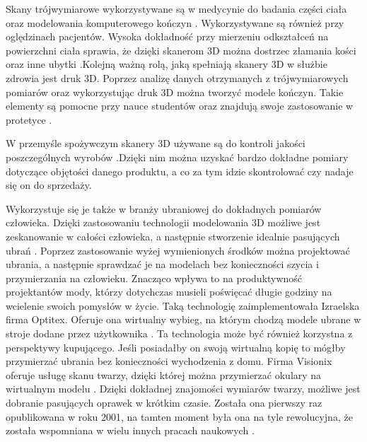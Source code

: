 Skany trójwymiarowe wykorzystywane są w medycynie do badania części ciała oraz modelowania komputerowego kończyn \cite{tomaka20053d}. Wykorzystywane są również przy oględzinach pacjentów. Wysoka dokładność przy mierzeniu odkształceń na powierzchni ciała sprawia, że dzięki skanerom 3D można dostrzec złamania kości oraz inne ubytki \cite{thali2003optical}.Kolejną ważną rolą, jaką spełniają skanery 3D w służbie zdrowia jest druk 3D. Poprzez analizę danych otrzymanych z trójwymiarowych pomiarów oraz wykorzystując druk 3D można tworzyć modele kończyn. Takie elementy są pomocne przy nauce studentów oraz znajdują swoje zastosowanie w protetyce \cite{mcmenamin2014production}. 

W przemyśle spożywczym skanery 3D używane są do kontroli jakości poszczególnych wyrobów \cite{anders2012zastosowanie}.Dzięki nim można uzyskać bardzo dokładne pomiary dotyczące objętości danego produktu, a co za tym idzie skontrolować czy nadaje się on do sprzedaży.

Wykorzystuje się je także w branży ubraniowej do dokładnych pomiarów człowieka. Dzięki zastosowaniu technologii modelowania 3D możliwe jest zeskanowanie w całości człowieka, a następnie stworzenie idealnie pasujących ubrań \cite{d20073d}. Poprzez zastosowanie wyżej wymienionych środków można projektować ubrania, a następnie sprawdzać je na modelach bez konieczności szycia i przymierzania na człowieku. Znacząco wpływa to na produktywność projektantów mody, którzy dotychczas musieli poświęcać długie godziny na wcielenie swoich pomysłów w życie. Taką technologię zaimplementowała Izraelska firma Optitex. Oferuje ona wirtualny wybieg, na którym chodzą modele ubrane w stroje dodane przez użytkownika \cite{israelVirtualTryOn}.  
Ta technologia może być również korzystna z perspektywy kupującego. Jeśli posiadałby on swoją wirtualną kopię to mógłby przymierzać ubrania bez konieczności wychodzenia z domu. Firma Visionix oferuje usługę skanu twarzy, dzięki której można przymierzać okulary na wirtualnym modelu \cite{visionX}. Dzięki dokładnej znajomości wymiarów twarzy, możliwe jest dobranie pasujących oprawek w krótkim czasie. Została ona pierwszy raz opublikowana w roku 2001, na tamten moment była ona na tyle rewolucyjna, że została wspomniana w wielu innych pracach naukowych \cite{d20073d} \cite{d2006state}.